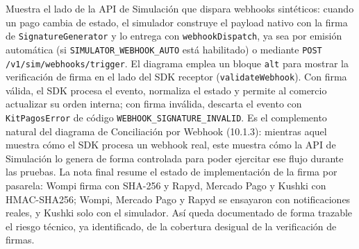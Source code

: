 Muestra el lado de la API de Simulación que dispara webhooks sintéticos: cuando un pago cambia de estado, el simulador construye el payload nativo con la firma de \texttt{SignatureGenerator} y lo entrega con \texttt{webhookDispatch}, ya sea por emisión automática (si \texttt{SIMULATOR\_WEBHOOK\_AUTO} está habilitado) o mediante \texttt{POST /v1/sim/webhooks/trigger}. El diagrama emplea un bloque \texttt{alt} para mostrar la verificación de firma en el lado del SDK receptor (\texttt{validateWebhook}). Con firma válida, el SDK procesa el evento, normaliza el estado y permite al comercio actualizar su orden interna; con firma inválida, descarta el evento con \texttt{KitPagosError} de código \texttt{WEBHOOK\_SIGNATURE\_INVALID}. Es el complemento natural del diagrama de Conciliación por Webhook (10.1.3): mientras aquel muestra cómo el SDK procesa un webhook real, este muestra cómo la API de Simulación lo genera de forma controlada para poder ejercitar ese flujo durante las pruebas. La nota final resume el estado de implementación de la firma por pasarela: Wompi firma con SHA-256 y Rapyd, Mercado Pago y Kushki con HMAC-SHA256; Wompi, Mercado Pago y Rapyd se ensayaron con notificaciones reales, y Kushki solo con el simulador. Así queda documentado de forma trazable el riesgo técnico, ya identificado, de la cobertura desigual de la verificación de firmas.
